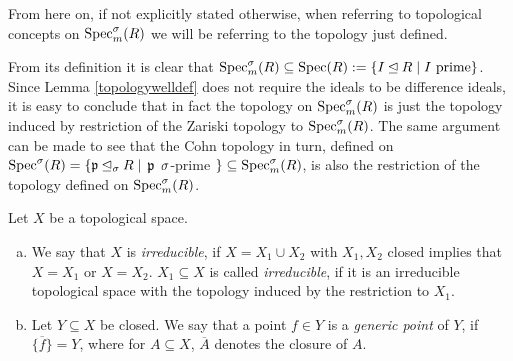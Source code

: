 From here on, if not explicitly stated otherwise, when referring to topological concepts on $\operatorname{Spec}^\sigma_m(R)$ we will be referring to the topology just defined.

\begin{rem}
From its definition it is clear that $\operatorname{Spec}^\sigma_m(R) \subseteq \operatorname{Spec}(R):= \{ I \unlhd R \mid I \text{ prime} \}$. Since Lemma \ref{topologywelldef} does not require the ideals to be difference ideals, 
it is easy to conclude that in fact the topology on $\operatorname{Spec}^\sigma_m(R)$ is just the topology induced by restriction of the Zariski topology to $\operatorname{Spec}^\sigma_m(R)$. The same argument can be made to see that the Cohn topology in turn,
defined on $\operatorname{Spec}^\sigma(R) = \{ \mathfrak{p} \unlhd_{\sigma} R \mid $ $\mathfrak{p}$ $ \sigma$-prime $\} \subseteq \operatorname{Spec}^\sigma_m(R)$, is also the restriction of the topology defined on $\operatorname{Spec}^\sigma_m(R)$. 
\end{rem}

\begin{defn}
Let $X$ be a topological space.
\begin{enumerate}[(a)]
\item  We say that $X$ is \emph{irreducible}, if $X = X_1 \cup X_2$ with $X_1, X_2$ closed implies that $X = X_1$ or $X = X_2$. 
$X_1 \subseteq X$ is called \emph{irreducible}, if it is an irreducible topological space with the topology induced by the restriction to $X_1$.
\item Let $Y \subseteq X$ be closed. We say that a point $f \in Y$ is a \emph{generic point} of $Y$, if $\overline{\{  f \} } = Y$, where for $A \subseteq X$, $\overline{A}$ denotes the closure of $A$. 
\end{enumerate}
\end{defn}

